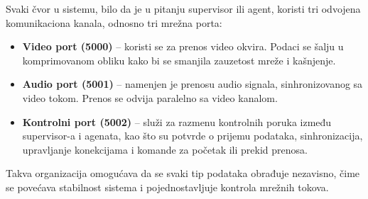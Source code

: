 \documentclass[a4paper,12pt]{article}
\begin{document}
Svaki čvor u sistemu, bilo da je u pitanju supervisor ili agent, koristi tri odvojena komunikaciona kanala, odnosno tri mrežna porta:

\begin{itemize}
    \item \textbf{Video port (5000)} – koristi se za prenos video okvira. Podaci se šalju u komprimovanom obliku kako bi se smanjila zauzetost mreže i kašnjenje.
    \item \textbf{Audio port (5001)} – namenjen je prenosu audio signala, sinhronizovanog sa video tokom. Prenos se odvija paralelno sa video kanalom.
    \item \textbf{Kontrolni port (5002)} – služi za razmenu kontrolnih poruka između supervisor-a i agenata, kao što su potvrde o prijemu podataka, sinhronizacija, upravljanje konekcijama i komande za početak ili prekid prenosa.
\end{itemize}

Takva organizacija omogućava da se svaki tip podataka obrađuje nezavisno, čime se povećava stabilnost sistema i pojednostavljuje kontrola mrežnih tokova.
\end{document}
